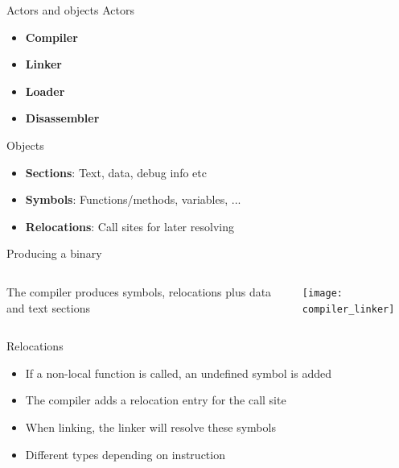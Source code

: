 \documentclass{beamer}
\begin{document}
  \begin{frame}{Actors and objects}
    Actors
    \begin{itemize}
      \item \textbf{Compiler}
      \item \textbf{Linker}
      \item \textbf{Loader}
      \item \textbf{Disassembler}
    \end{itemize}
    Objects
    \begin{itemize}
      \item \textbf{Sections}: Text, data, debug info etc
      \item \textbf{Symbols}: Functions/methods, variables, ...
      \item \textbf{Relocations}: Call sites for later resolving
    \end{itemize}

\end{frame}

\begin{frame}{Producing a binary}
  \begin{columns}
    \begin{column}{0.5\textwidth}
      The compiler produces symbols, relocations plus data and text sections
    \end{column}
    \begin{column}{0.5\textwidth}
      \texttt{[image: compiler\_linker]}
    \end{column}
  \end{columns}
\end{frame}

\begin{frame}{Relocations}
  \begin{itemize}
    \item If a non-local function is called, an undefined symbol is added
    \item The compiler adds a relocation entry for the call site
    \item When linking, the linker will resolve these symbols
    \item Different types depending on instruction
  \end{itemize}
\end{frame}
\end{document}
